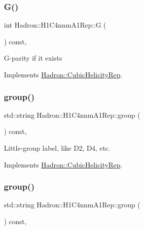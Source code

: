\subsubsection{\texorpdfstring{G()}{G()}\hspace{0.1cm}{\footnotesize\ttfamily [3/3]}}
{\footnotesize\ttfamily int Hadron\+::\+H1\+C4nnm\+A1\+Rep\+::G (\begin{DoxyParamCaption}{ }\end{DoxyParamCaption}) const\hspace{0.3cm}{\ttfamily [inline]}, {\ttfamily [virtual]}}

G-\/parity if it exists 

Implements \mbox{\hyperlink{structHadron_1_1CubicHelicityRep_a50689f42be1e6170aa8cf6ad0597018b}{Hadron\+::\+Cubic\+Helicity\+Rep}}.

\mbox{\label{structHadron_1_1H1C4nnmA1Rep_ac58ca1a17658ee7043603fb04a470665}} 
\subsubsection{\texorpdfstring{group()}{group()}\hspace{0.1cm}{\footnotesize\ttfamily [1/5]}}
{\footnotesize\ttfamily std\+::string Hadron\+::\+H1\+C4nnm\+A1\+Rep\+::group (\begin{DoxyParamCaption}{ }\end{DoxyParamCaption}) const\hspace{0.3cm}{\ttfamily [inline]}, {\ttfamily [virtual]}}

Little-\/group label, like D2, D4, etc. 

Implements \mbox{\hyperlink{structHadron_1_1CubicHelicityRep_a101a7d76cd8ccdad0f272db44b766113}{Hadron\+::\+Cubic\+Helicity\+Rep}}.

\mbox{\label{structHadron_1_1H1C4nnmA1Rep_ac58ca1a17658ee7043603fb04a470665}} 
\subsubsection{\texorpdfstring{group()}{group()}\hspace{0.1cm}{\footnotesize\ttfamily [2/5]}}
{\footnotesize\ttfamily std\+::string Hadron\+::\+H1\+C4nnm\+A1\+Rep\+::group (\begin{DoxyParamCaption}{ }\end{DoxyParamCaption}) const\hspace{0.3cm}{\ttfamily [inline]}, {\ttfamily [virtual]}}

